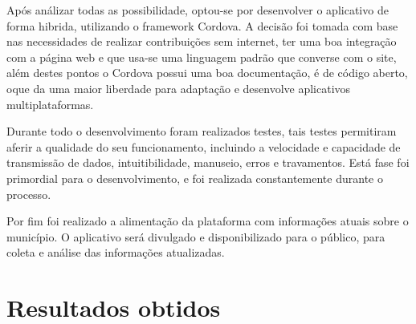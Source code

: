 Após análizar todas as possibilidade, optou-se por desenvolver o aplicativo de forma hibrida, utilizando o framework Cordova. A decisão foi tomada com base nas necessidades de realizar contribuições sem internet, ter uma boa integração com a página web e que usa-se uma linguagem padrão que converse com o site, além destes pontos o Cordova possui uma boa documentação, é de código aberto, oque da uma maior liberdade para adaptação e desenvolve aplicativos multiplataformas.

Durante todo o desenvolvimento foram realizados testes, tais testes permitiram aferir a qualidade do seu funcionamento, incluindo a velocidade e capacidade de transmissão de dados, intuitibilidade, manuseio, erros e travamentos. Está fase foi primordial para o desenvolvimento, e foi realizada constantemente durante o processo.

Por fim foi realizado a alimentação da plataforma com informações atuais sobre o município. O aplicativo será divulgado e disponibilizado para o público, para coleta e análise das informações atualizadas.

\chapter{Resultados obtidos}